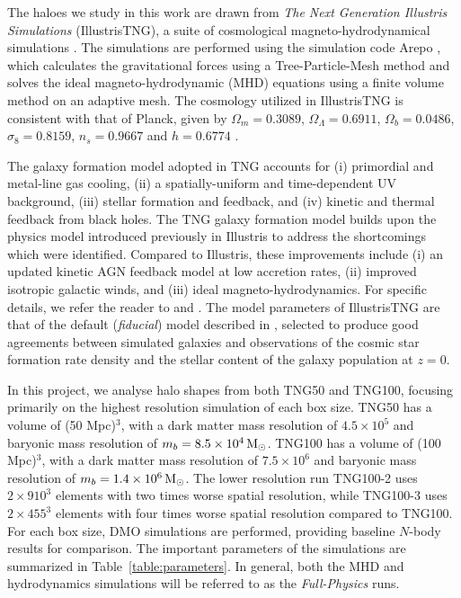 \documentclass[fleqn,usenatbib]{mnras}
\def\msun{\,\rm M_{\odot}}
\begin{document}
The haloes we study in this work are drawn from \emph{The Next Generation Illustris Simulations} (IllustrisTNG), a suite of cosmological magneto-hydrodynamical simulations \citep{Marinacci18v480, Naiman18v477, Nelson17v475, Pillepich18v475, Springel18v475}.
The simulations are performed using the simulation code {\sc Arepo} \citep{Springel09v401}, which calculates the gravitational forces using a Tree-Particle-Mesh method and solves the ideal magneto-hydrodynamic (MHD) equations using a finite volume method on an adaptive mesh.
The cosmology utilized in IllustrisTNG is consistent with that of Planck, given by $\Omega_m = 0.3089$, $\Omega_\Lambda = 0.6911$, $\Omega_b = 0.0486$, $\sigma_8 = 0.8159$, $n_s = 0.9667$ and $h = 0.6774$ \citep{Planck,Spergel15v91}.

The galaxy formation model adopted in TNG accounts for 
(i) primordial and metal-line gas cooling, 
(ii) a spatially-uniform and time-dependent UV background, 
(iii) stellar formation and  feedback, and 
(iv) kinetic and thermal feedback from black holes.
The TNG galaxy formation model builds upon the physics model introduced previously in  Illustris to address the shortcomings which were identified.
Compared to Illustris, these improvements include
(i) an updated kinetic AGN feedback model at low accretion rates, 
(ii) improved isotropic galactic winds, and
(iii) ideal magneto-hydrodynamics.
For specific details, we refer the reader to \cite{Weinberger17v465} and \cite{Pillepich18v473}.
The model parameters of IllustrisTNG are that of the default (\emph{fiducial}) model described in \cite{Pillepich18v473}, selected to produce good agreements between simulated galaxies and observations of the cosmic star formation rate density and the stellar content of the galaxy population at $z=0$.

In this project, we analyse halo shapes from both TNG50 \citep{Pillepich19v490, Nelson19v490} and TNG100, focusing primarily on the highest resolution simulation of each box size.
TNG50 has a volume of (50 Mpc)$^3$, with a dark matter mass resolution of $4.5 \times 10^5$ and baryonic mass resolution of $m_b = 8.5 \times 10^4 \msun$. 
TNG100 has a volume of (100 Mpc)$^3$, with a dark matter mass resolution of $7.5 \times 10^6$ and baryonic mass resolution of $m_b = 1.4 \times 10^6 \msun$. 
The lower resolution run TNG100-2 uses $2\times910^3$  elements with two times worse spatial resolution, while TNG100-3 uses $2 \times 455^3$ elements with four times worse spatial resolution compared to TNG100.
For each box size, DMO simulations are performed, providing baseline $N$-body results for comparison.
The important parameters of the simulations are summarized in Table~\ref{table:parameters}.
In general, both the MHD and hydrodynamics simulations will be referred to as the \emph{Full-Physics} runs.
\end{document}
